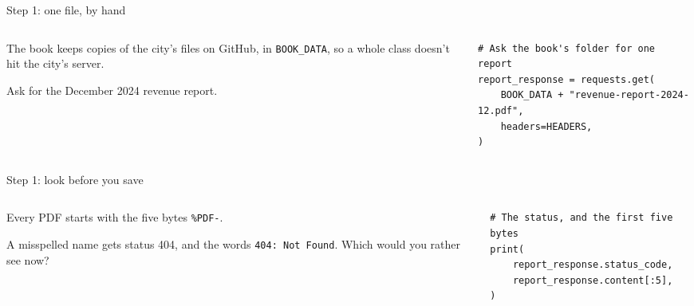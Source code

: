 \documentclass[9pt,aspectratio=169]{beamer}
\begin{document}
\begin{frame}[fragile]{Step 1: one file, by hand}
    \begin{columns}[T]
        \begin{column}{0.37\textwidth}
            The book keeps copies of the city's files on GitHub, in \texttt{BOOK\_DATA}, so a whole class doesn't hit the city's server.

            \medskip
            Ask for the December 2024 revenue report.
        \end{column}
        \begin{column}{0.6\textwidth}
\begin{lstlisting}
# Ask the book's folder for one report
report_response = requests.get(
    BOOK_DATA + "revenue-report-2024-12.pdf",
    headers=HEADERS,
)
\end{lstlisting}
        \end{column}
    \end{columns}
\end{frame}

\begin{frame}[fragile]{Step 1: look before you save}
    \begin{columns}[T]
        \begin{column}{0.37\textwidth}
            Every PDF starts with the five bytes \texttt{\%PDF-}.

            \medskip
            A misspelled name gets status 404, and the words \texttt{404: Not Found}. Which would you rather see now?
        \end{column}
        \begin{column}{0.6\textwidth}
\begin{lstlisting}
# The status, and the first five bytes
print(
    report_response.status_code,
    report_response.content[:5],
)
\end{lstlisting}
        \end{column}
    \end{columns}
\end{frame}
\end{document}

